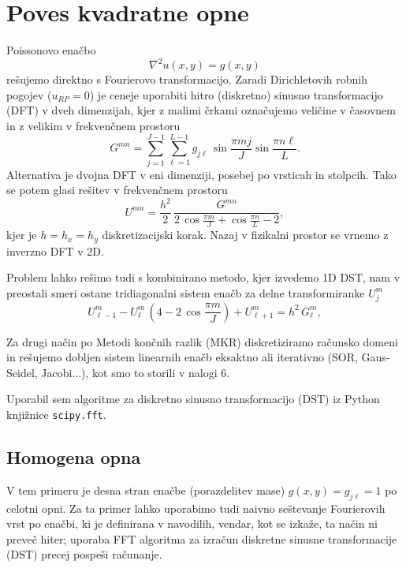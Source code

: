 \section{Poves kvadratne opne}

Poissonovo enačbo
\begin{equation}
    \nabla^2 u(x,y) = g(x,y)
\end{equation}
rešujemo direktno s Fourierovo transformacijo. Zaradi Dirichletovih robnih pogojev ($u_{RP}=0$) je ceneje uporabiti hitro (diskretno) sinusno transformacijo (DFT) v dveh dimenzijah, kjer z malimi črkami označujemo veličine v časovnem in z velikim v frekvenčnem prostoru
\begin{equation}
    G^{m n} = \sum_{j=1}^{J-1} \sum_{\ell=1}^{L-1} g_{j \ell} \, \sin  \frac{\pi m j}{J} \sin \frac{\pi n \ell}{L}.
\end{equation}
Alternativa je dvojna DFT v eni dimenziji, posebej po vrsticah in stolpcih.
Tako se potem glasi rešitev v frekvenčnem prostoru
\begin{equation}
    U^{m n} = \frac{h^2}{2}\,\frac{G^{m n}}{2\,\cos{\frac{\pi m}{J}} + \cos{\frac{\pi n}{L}} -2},
\end{equation}
kjer je $h=h_x=h_y$ diskretizacijski korak. Nazaj v fizikalni prostor se vrnemo z inverzno DFT v 2D.

Problem lahko rešimo tudi s kombinirano metodo, kjer izvedemo 1D DST, nam v preostali smeri ostane tridiagonalni sistem enačb za delne transformiranke $U_j^m$
\begin{equation}
    U_{\ell-1}^m -U_{\ell}^m\,(4-2\,\cos{\frac{\pi m}{J}}) + U_{\ell+1}^m = h^2\,G_{\ell}^m,
\end{equation}

Za drugi način po Metodi končnih razlik (MKR)  diskretiziramo računsko domeni in rešujemo dobljen sistem linearnih enačb eksaktno ali iterativno (SOR, Gaus-Seidel, Jacobi...), kot smo to storili v nalogi 6.

Uporabil sem algoritme za diskretno sinusno transformacijo (DST) iz Python knjižnice \texttt{scipy.fft}.

\subsection{Homogena opna}

V tem primeru je desna stran enačbe (porazdelitev mase) $g(x,y) = g_{j\ell} = 1$ po celotni opni. Za ta primer lahko uporabimo tudi naivno seštevanje Fourierovih vrst po enačbi, ki je definirana v navodilih, vendar, kot se izkaže, ta način ni preveč hiter; uporaba FFT algoritma za izračun diskretne sinusne transformacije (DST) precej pospeši računanje.

